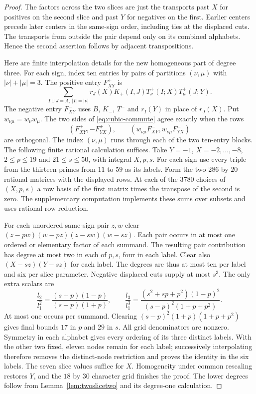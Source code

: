 \begin{proof}
The factors across the two slices are just the transports past $X$
for positives on the second slice and past $Y$ for negatives on the
first. Earlier centers precede later centers in the same-sign order,
including ties at the displaced cuts. The transports from outside the
pair depend only on its combined alphabets. Hence the second assertion
follows by adjacent transpositions.

Here are finite interpolation details for the new homogeneous part
of degree three. For each sign, index ten entries by pairs of partitions
$(\nu,\mu)$ with $|\nu|+|\mu|=3$. The positive entry $F^+_{XY}$ is
\[
 \sum_{I\sqcup J=A,\ |I|=|\nu|}
       r_J(X)K_+(I,J)T^+_\nu(I;X)T^+_\mu(J;Y).
\]
The negative entry $F^-_{XY}$ uses $B$, $K_-$, $T^-$ and $r_I(Y)$
in place of $r_J(X)$. Put $w_{\nu\mu}=w_\nu w_\mu$. The two sides of
\eqref{eq:cubic-commute} agree exactly when the rows
\[
 (F^+_{XY},-F^+_{YX}),\qquad
 (w_{\nu\mu}F^-_{XY},w_{\nu\mu}F^-_{YX})
\]
are orthogonal. The index $(\nu,\mu)$ runs through each of the two
ten-entry blocks. The following finite rational calculation suffices.
Take $Y=-1$, $X=-2,\ldots,-8$, $2\le p\le19$ and $21\le s\le50$,
with integral $X,p,s$. For each sign use every triple from the thirteen
primes from $11$ to $59$ as its labels. Form the two $286$ by $20$
rational matrices with the displayed rows. At each of the $3780$
choices of $(X,p,s)$ a row basis of the first matrix times the
transpose of the second is zero. The supplementary computation
implements these sums over subsets and uses rational row reduction.

For each unordered same-sign pair $z,w$ clear
$(z-pw)(w-pz)(z-sw)(w-sz)$. Each pair occurs in at most one ordered
or elementary factor of each summand. The resulting pair contribution
has degree at most two in each of $p,s$, four in each label. Clear also
$(X-sz)(Y-sz)$ for each label. The degrees are thus at most ten per
label and six per slice parameter. Negative displaced cuts supply at
most $s^3$. The only extra scalars are
\[
 \frac{l_2}{l_1^2}=\frac{(s+p)(1-p)}{(s-p)(1+p)},\qquad
 \frac{l_3}{l_1^3}=\frac{(s^2+sp+p^2)(1-p)^2}
                           {(s-p)^2(1+p+p^2)} .
\]
At most one occurs per summand. Clearing
$(s-p)^2(1+p)(1+p+p^2)$ gives final bounds $17$ in $p$ and $29$
in $s$. All grid denominators are nonzero. Symmetry in each alphabet
gives every ordering of its three distinct labels. With the other
two fixed, eleven nodes remain for each label; successively interpolating
therefore removes the distinct-node restriction and proves the identity
in the six labels. The seven slice values suffice for $X$.
Homogeneity under common rescaling restores $Y$, and the $18$ by
$30$ character grid finishes the proof. The lower degrees follow from Lemma~\ref{lem:twoslicetwo} and its degree-one calculation.
\end{proof}

